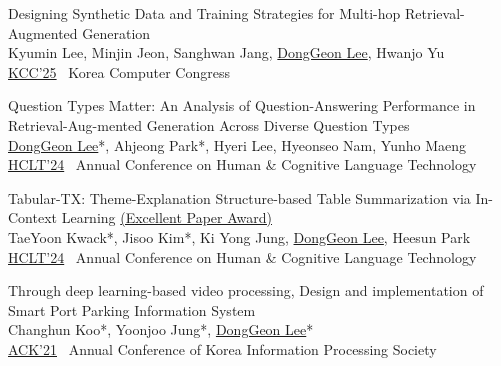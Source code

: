 \documentclass[11pt,a4paper]{article}
\newcounter{pubnum}
\newenvironment{publications}
{\begin{list}{}
    {\setlength{\leftmargin}{1.35in}
     \setlength{\itemsep}{0.5em}
     \setlength{\labelsep}{0em}
     \renewcommand{\makelabel}[1]{##1}}}
{\end{list}}
\newcommand{\pubitem}[1]{%
    \addtocounter{pubnum}{-1}%
    \item[\textup{[\arabic{pubnum}]}] #1%
}
\begin{document}
\begin{publications}
\pubitem{
    Designing Synthetic Data and Training Strategies for Multi-hop Retrieval-Augmented Generation\\
        Kyumin Lee, Minjin Jeon, Sanghwan Jang, \underline{DongGeon Lee}, Hwanjo Yu \\[3pt]
        \href{}{KCC'25} \textbar\ Korea Computer Congress
}

\pubitem{
    Question Types Matter: An Analysis of Question-Answering Performance in Retrieval-Aug-mented Generation Across Diverse Question Types\\
        \underline{DongGeon Lee}*, Ahjeong Park*, Hyeri Lee, Hyeonseo Nam, Yunho Maeng \\[3pt]
        \href{https://koreascience.kr/article/CFKO202404272002603.page}{HCLT'24} \textbar\ Annual Conference on Human \& Cognitive Language Technology 
}

\pubitem{
    Tabular-TX: Theme-Explanation Structure-based Table Summarization via In-Context Learning \href{https://kli.korean.go.kr/benchmark/taskBoardsOrdtm/boardsOrdtm/noticeView.do?page=0&recordId=269&boardOrdtmId=&base.condition=boardOrdtm.title&base.keyword=&size=10}{(Excellent Paper Award)}\\
        TaeYoon Kwack*, Jisoo Kim*, Ki Yong Jung, \underline{DongGeon Lee}, Heesun Park  \\[3pt]
        \href{https://koreascience.kr/article/CFKO202404272003862.page}{HCLT'24} \textbar\ Annual Conference on Human \& Cognitive Language Technology
}

\pubitem{
    Through deep learning-based video processing, Design and implementation of Smart Port Parking Information System\\
        Changhun Koo*, Yoonjoo Jung*, \underline{DongGeon Lee}*\\[3pt]
        \href{https://doi.org/10.3745/PKIPS.y2021m11a.1342}{ACK'21} \textbar\ Annual Conference of Korea Information Processing Society
}


\end{publications}

\vspace{1em}
\end{document}
